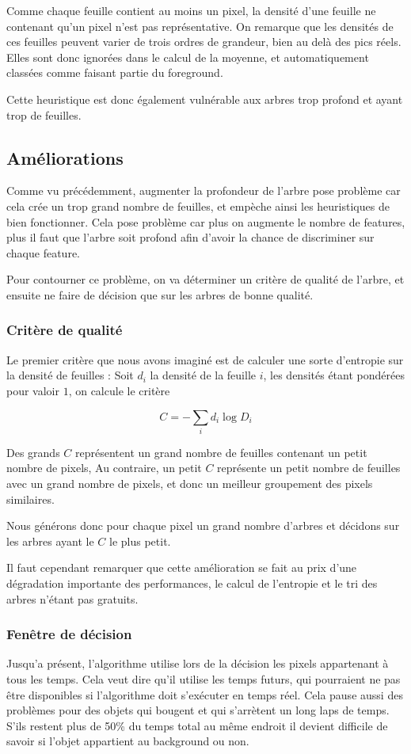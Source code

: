 \documentclass[8pt,a4paper]{report}
\begin{document}
\begin{multicols}{2}
			Comme chaque feuille contient au moins un pixel, la densité d'une feuille ne contenant qu'un pixel n'est pas
			représentative. On remarque que les densités de ces feuilles peuvent varier de trois ordres de grandeur, bien
			au delà des pics réels. Elles sont donc ignorées dans le calcul de la moyenne, et automatiquement classées
			comme faisant partie du foreground. 

			Cette heuristique est donc également vulnérable aux arbres trop profond et ayant trop de feuilles. 

	\subsection{Améliorations}
		Comme vu précédemment, augmenter la profondeur de l'arbre pose problème car cela crée un trop grand nombre de feuilles, 
		et empèche ainsi les heuristiques de bien fonctionner. Cela pose problème car plus on augmente le nombre de features,
		plus il faut que l'arbre soit profond afin d'avoir la chance de discriminer sur chaque feature. 

		Pour contourner ce problème, on va déterminer un critère de qualité de l'arbre, et ensuite ne faire de décision que sur
		les arbres de bonne qualité. 
		\subsubsection{Critère de qualité}
			Le premier critère que nous avons imaginé est de calculer une sorte d'entropie sur la densité de feuilles : 
			Soit $d_{i}$ la densité de la feuille $i$, les densités étant pondérées pour valoir $1$, on calcule le critère 
			
			\[ C = -\sum_{i} d_{i}\log{D_{i}} \]

			Des grands $C$ représentent un grand nombre de feuilles contenant un petit nombre de pixels, Au contraire, un petit $C$
			représente un petit nombre de feuilles avec un grand nombre de pixels, et donc un meilleur groupement des pixels
			similaires. 

			Nous générons donc pour chaque pixel un grand nombre d'arbres et décidons sur les arbres ayant le $C$ le plus petit.

			Il faut cependant remarquer que cette amélioration se fait au prix d'une dégradation importante des performances,
			le calcul de l'entropie et le tri des arbres n'étant pas gratuits.
		\subsubsection{Fenêtre de décision}
			Jusqu'a présent, l'algorithme utilise lors de la décision les pixels appartenant à tous les temps. Cela veut dire qu'il
			utilise les temps futurs, qui pourraient ne pas être disponibles si l'algorithme doit s'exécuter en temps réel. Cela
			pause aussi des problèmes pour des objets qui bougent et qui s'arrètent un long laps de temps. S'ils restent plus
			de 50\% du temps total au même endroit il devient difficile de savoir si l'objet appartient au background ou non.


\end{multicols}
\end{document}
